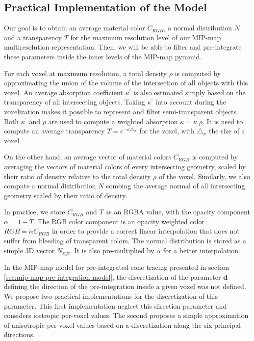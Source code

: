\subsection{Practical Implementation of the Model}
Our goal is to obtain an average material color $C_{RGB}$, a normal distribution $N$ and a transparency $T$ for the maximum resolution level of our MIP-map multiresolution representation. Then, we will be able to filter and pre-integrate these parameters inside the inner levels of the MIP-map pyramid.

For each voxel at maximum resolution, a total density $\rho$ is computed by approximating the union of the volume of the intersection of all objects with this voxel. An average absorption coefficient $\kappa^{'}$ is also estimated simply based on the transparency of all intersecting objects. Taking $\kappa^{'}$ into account during the voxelization makes it possible to represent and filter semi-transparent objects. Both $\kappa^{'}$ and $\rho$ are used to compute a weighted absorption $\kappa=\kappa^{'}\rho$. It is used to compute an average transparency $T=e^{-\kappa\triangle_x}$ for the voxel, with $\triangle_x$ the size of a voxel.

On the other hand, an average vector of material colors $C_{RGB}$ is computed by averaging the vectors of material colors of every intersecting geometry, scaled by their ratio of density relative to the total density $\rho$ of the voxel. Similarly, we also compute a normal distribution $N$ combing the average normal of all intersecting geometry scaled by their ratio of density.

In practice, we store $C_{RGB}$ and $T$ as an RGBA value, with the opacity component $\alpha=1-T$. The RGB color component is an opacity weighted color $RGB=\alpha C_{RGB}$ in order to provide a correct linear interpolation that does not suffer from bleeding of transparent colors. The normal distribution is stored as a simple 3D vector $N_{xyz}$. It is also pre-multiplied by $\alpha$ for a better interpolation.

In the MIP-map model for pre-integrated cone tracing presented in section \ref{sec:mip-map-pre-integration-model}, the discretization of the parameter $\mathbf{d}$ defining the direction of the pre-integration inside a given voxel was not defined. We propose two practical implementations for the discretization of this parameter. This first implementation neglect this direction parameter and considers iostropic per-voxel values. The second proposes a simple approximation of anisotropic per-voxel values based on a discretization along the six principal directions.



